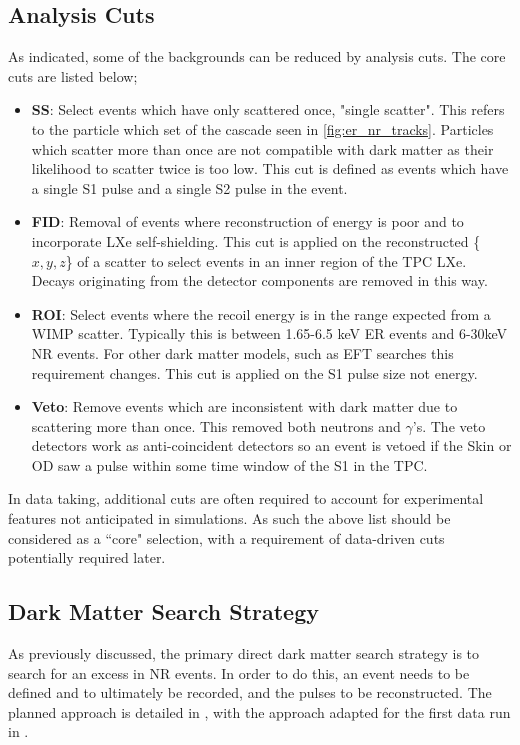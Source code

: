 \subsection{Analysis Cuts}
\par
As indicated, some of the backgrounds can be reduced by analysis cuts. 
The core cuts are listed below;
\begin{itemize}
    \item \textbf{SS}: Select events which have only scattered once, "single scatter". This refers to the particle which set of the cascade seen in \autoref{fig:er_nr_tracks}. Particles which scatter more than once are not compatible with dark matter as their likelihood to scatter twice is too low. This cut is defined as events which have a single S1 pulse and a single S2 pulse in the event.
    \item \textbf{FID}: Removal of events where reconstruction of energy is poor and to incorporate LXe self-shielding. This cut is applied on the reconstructed \{$x,y,z$\} of a scatter to select events in an inner region of the TPC LXe. Decays originating from the detector components are removed in this way.
    \item \textbf{ROI}: Select events where the recoil energy is in the range expected from a WIMP scatter. Typically this is between 1.65-6.5 keV ER events and 6-30keV NR events. For other dark matter models, such as EFT searches this requirement changes. This cut is applied on the S1 pulse size not energy.
    \item \textbf{Veto}: Remove events which are inconsistent with dark matter due to scattering more than once. This removed both neutrons and $\gamma$'s. The veto detectors work as anti-coincident detectors so an event is vetoed if the Skin or OD saw a pulse within some time window of the S1 in the TPC.
\end{itemize}
In data taking, additional cuts are often required to account for experimental features not anticipated in simulations.
As such the above list should be considered as a ``core" selection, with a requirement of data-driven cuts potentially required later.

\subsection{Dark Matter Search Strategy}
\par
As previously discussed, the primary direct dark matter search strategy is to search for an excess in NR events.
In order to do this, an event needs to be defined and to ultimately be recorded, and the pulses to be reconstructed.
The planned approach is detailed in \cite{LZ_TechnicalDesignReview_ref}, with the approach adapted for the first data run in \cite{lz_ws_sr1_ref}.


